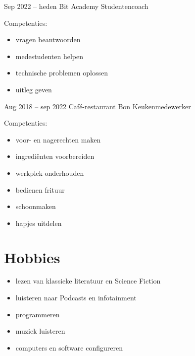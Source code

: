\documentclass[
	11pt, %
]{FreemanCV}
\begin{document}
\begin{paracol}{2}
	\jobentry
	{Sep 2022 -- heden} %
	{} %
	{Bit Academy} %
	{Studentencoach} %
	{Competenties:
		\begin{itemize}
			\item vragen beantwoorden
			\item medestudenten helpen
			\item technische problemen oplossen
			\item uitleg geven
		\end{itemize}
	} %

	\jobentry
	{Aug 2018 -- sep 2022} %
	{} %
	{Café-restaurant Bon} %
	{Keukenmedewerker} %
	{Competenties:
		\begin{itemize}
			\item voor- en nagerechten maken
			\item ingrediënten voorbereiden
			\item werkplek onderhouden
			\item bedienen frituur
			\item schoonmaken
			\item hapjes uitdelen
		\end{itemize}
	} %

	\section{Hobbies}

	\begin{itemize}
		\item lezen van klassieke literatuur en Science Fiction
		\item luisteren naar Podcasts en infotainment
		\item programmeren
		\item muziek luisteren
		\item computers en software configureren
	\end{itemize}





\end{paracol}
\end{document}
